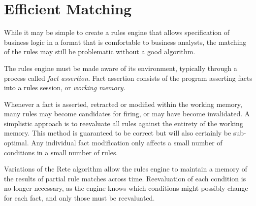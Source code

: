 \section{Efficient Matching}

While it may be simple to create a rules engine that 
allows specification of business logic in a format
that is comfortable to business analysts, the matching
of the rules may still be problematic without a good
algorithm.

The rules engine must be made aware of its environment,
typically through a process called \emph{fact assertion}.
Fact assertion consists of the program asserting facts
into a rules session, or \emph{working memory}.

Whenever a fact is asserted, retracted or modified within 
the working memory, many rules may become candidates for 
firing, or may have become invalidated.  A simplistic
approach is to reevaluate all rules against the entirety
of the working memory.  This method is guaranteed to be
correct but will also certainly be sub-optimal.  Any
individual fact modification only affects a small number
of conditions in a small number of rules.  

Variations of the Rete algorithm allow the rules engine
to maintain a memory of the results of partial rule
matches across time.  Reevaluation of each condition
is no longer necessary, as the engine knows which conditions
might possibly change for each fact, and only those 
must be reevaluated.



